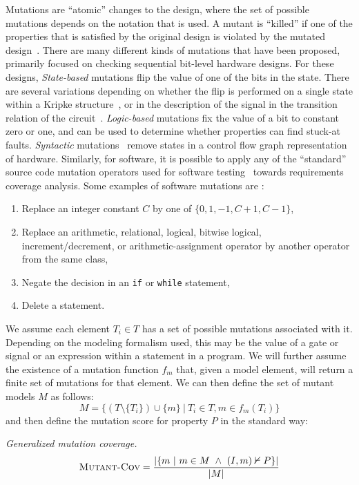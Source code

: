 \iffalse 
Mutations are ``atomic'' changes to the design, where the set of possible mutations depends on the notation that is used.  A mutant is ``killed'' if one of the properties that is satisfied by the original design is violated by the mutated design~\cite{chockler_coverage_2003,chockler2001practical,chockler2010coverage,Kupferman:2006:SCF,kupferman_theory_2008}.  There are many different kinds of mutations that have been proposed, primarily focused on checking sequential bit-level hardware designs.
For these designs, {\em State-based} mutations flip the value of one of the bits in the state.  There are several variations depending on whether the flip is performed on a single state within a Kripke structure~\cite{hoskote1999coverage}, or in the description of the signal in the transition relation of the circuit~\cite{chockler2001practical}.  {\em Logic-based} mutations fix the value of a bit to constant zero or one, and can be used to determine whether properties can find stuck-at faults.  {\em Syntactic} mutations~\cite{chockler_coverage_2003} remove states in a control flow graph representation of hardware.
Similarly, for software, it is possible to apply any of the ``standard'' source code mutation operators used for software testing~\cite{Andrews06:mutation} towards requirements coverage analysis.
Some examples of software mutations are \cite{Budd:1980}:
\begin{enumerate}
    \item Replace an integer constant $C$ by one of $\{0, 1, -1, C + 1, C - 1\}$,
    \item Replace an arithmetic, relational, logical, bitwise logical, increment/decrement, or arithmetic-assignment operator by another operator from the same class,
    \item Negate the decision in an \texttt{if} or \texttt{while} statement,
    \item Delete a statement.
\end{enumerate}

We assume each element $T_i \in T$ has a set of possible mutations associated with it.  Depending on the modeling formalism used, this may be the value of a gate or signal or an expression within a statement in a program.  We will further assume the existence of a mutation function $f_{m}$ that, given a model element, will return a finite set of mutations for that element.  We can then define the set of mutant models $M$ as follows:
\[
    M = \{ (T \setminus \{T_i\}) \cup \{m\} \ |\ T_i \in T, m \in f_{m}(T_i) \}
\]
\noindent and then define the mutation score for property $P$ in the standard way:
\begin{definition} {\emph{Generalized mutation coverage.} } \\
\[
   \text{\sc Mutant-Cov} = \frac{ | \{m~|~ m \in M~\land~(I, m) \nvdash P\} |}{|M|}
\]
\end{definition}

